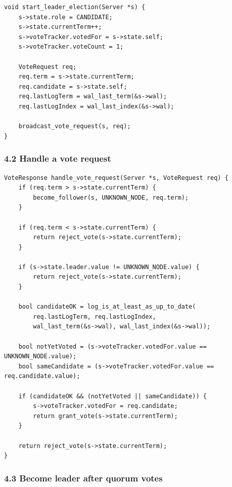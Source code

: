 \documentclass[10pt,letterpaper]{article}
\begin{document}
\begin{verbatim}
void start_leader_election(Server *s) {
    s->state.role = CANDIDATE;
    s->state.currentTerm++;
    s->voteTracker.votedFor = s->state.self;
    s->voteTracker.voteCount = 1;

    VoteRequest req;
    req.term = s->state.currentTerm;
    req.candidate = s->state.self;
    req.lastLogTerm = wal_last_term(&s->wal);
    req.lastLogIndex = wal_last_index(&s->wal);

    broadcast_vote_request(s, req);
}
\end{verbatim}

\subsubsection*{4.2 Handle a vote request}

\begin{verbatim}
VoteResponse handle_vote_request(Server *s, VoteRequest req) {
    if (req.term > s->state.currentTerm) {
        become_follower(s, UNKNOWN_NODE, req.term);
    }

    if (req.term < s->state.currentTerm) {
        return reject_vote(s->state.currentTerm);
    }

    if (s->state.leader.value != UNKNOWN_NODE.value) {
        return reject_vote(s->state.currentTerm);
    }

    bool candidateOK = log_is_at_least_as_up_to_date(
        req.lastLogTerm, req.lastLogIndex,
        wal_last_term(&s->wal), wal_last_index(&s->wal));

    bool notYetVoted = (s->voteTracker.votedFor.value == UNKNOWN_NODE.value);
    bool sameCandidate = (s->voteTracker.votedFor.value == req.candidate.value);

    if (candidateOK && (notYetVoted || sameCandidate)) {
        s->voteTracker.votedFor = req.candidate;
        return grant_vote(s->state.currentTerm);
    }

    return reject_vote(s->state.currentTerm);
}
\end{verbatim}

\subsubsection*{4.3 Become leader after quorum votes}
\end{document}

